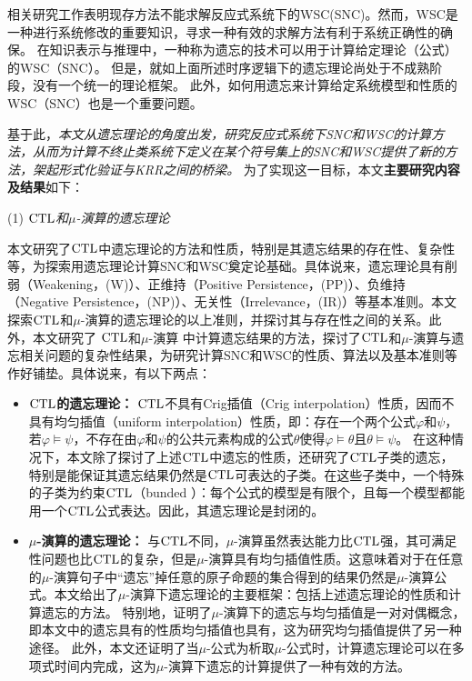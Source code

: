 相关研究工作表明现存方法不能求解反应式系统下的WSC(SNC)。然而，WSC是一种进行系统修改的重要知识，寻求一种有效的求解方法有利于系统正确性的确保。
在知识表示与推理中，一种称为遗忘的技术可以用于计算给定理论（公式）的WSC（SNC）。
但是，就如上面所述时序逻辑下的遗忘理论尚处于不成熟阶段，没有一个统一的理论框架。
此外，如何用遗忘来计算给定系统模型和性质的WSC（SNC）也是一个重要问题。

基于此，{\em 本文从遗忘理论的角度出发，研究反应式系统下SNC和WSC的计算方法，从而为计算不终止类系统下定义在某个符号集上的SNC和WSC提供了新的方法，架起形式化验证与KRR之间的桥梁。}
为了实现这一目标，本文\textbf{主要研究内容及结果}如下：

(1) {\em $\textrm{CTL}$和$\mu$-演算的遗忘理论}

本文研究了$\textrm{CTL}$中遗忘理论的方法和性质，特别是其遗忘结果的存在性、复杂性等，为探索用遗忘理论计算SNC和WSC奠定论基础。具体说来，遗忘理论具有削弱（Weakening，(W)）、正维持（Positive Persistence，(PP)）、负维持（Negative Persistence，(NP)）、无关性（Irrelevance，(IR)）等基本准则\cite{Yan:AIJ:2009}。本文探索$\textrm{CTL}$和$\mu$-演算的遗忘理论的以上准则，并探讨其与存在性之间的关系。此外，本文研究了 $\textrm{CTL}$和$\mu$-演算 中计算遗忘结果的方法，探讨了$\textrm{CTL}$和$\mu$-演算与遗忘相关问题的复杂性结果，为研究计算SNC和WSC的性质、算法以及基本准则等作好铺垫。具体说来，有以下两点：
\begin{itemize}
	\item \textbf{$\textrm{CTL}$的遗忘理论：}
	$\textrm{CTL}$不具有Crig插值（Crig interpolation）性质，因而不具有均匀插值（uniform interpolation）性质\cite{Maksimova:JANCL:1991}，即：存在一个两个公式$\varphi$和$\psi$，若$\varphi \models \psi$，不存在由$\varphi$和$\psi$的公共元素构成的公式$\theta$使得$\varphi \models \theta$且$\theta \models \psi$。
	在这种情况下，本文除了探讨了上述$\textrm{CTL}$中遗忘的性质，还研究了$\textrm{CTL}$子类的遗忘，特别是能保证其遗忘结果仍然是$\textrm{CTL}$可表达的子类。在这些子类中，一个特殊的子类为约束$\textrm{CTL}$（bunded \CTL）：每个公式的模型是有限个，且每一个模型都能用一个$\textrm{CTL}$公式表达。因此，其遗忘理论是封闭的。
	
	\item \textbf{$\mu$-演算的遗忘理论：}
	与$\textrm{CTL}$不同，$\mu$-演算虽然表达能力比$\textrm{CTL}$强，其可满足性问题也比$\textrm{CTL}$的复杂，但是$\mu$-演算具有均匀插值性质\cite{d2006modal}。这意味着对于在任意的$\mu$-演算句子中“遗忘”掉任意的原子命题的集合得到的结果仍然是$\mu$-演算公式。本文给出了$\mu$-演算下遗忘理论的主要框架：包括上述遗忘理论的性质和计算遗忘的方法。
	特别地，证明了$\mu$-演算下的遗忘与均匀插值是一对对偶概念，即本文中的遗忘具有的性质均匀插值也具有，这为研究均匀插值提供了另一种途径。
	此外，本文还证明了当$\mu$-公式为析取$\mu$-公式时，计算遗忘理论可以在多项式时间内完成，这为$\mu$-演算下遗忘的计算提供了一种有效的方法。
\end{itemize}


